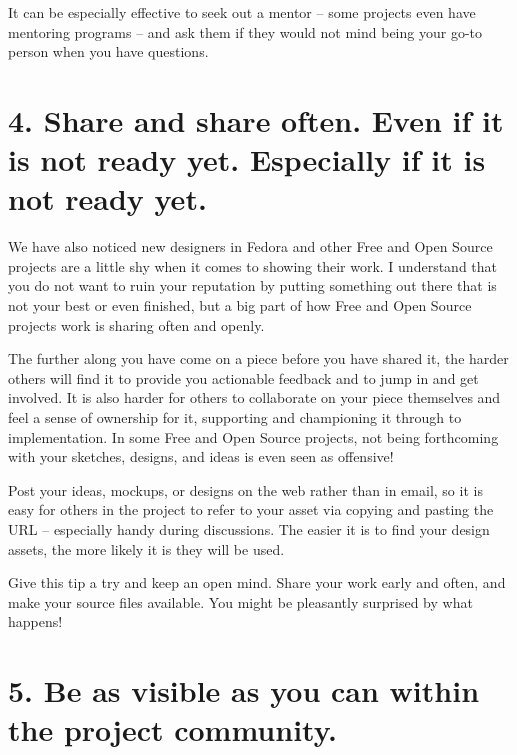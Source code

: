 It can be especially effective to seek out a mentor -- some projects even have
mentoring programs -- and ask them if they would not mind being your go-to person when you have questions. 

\section*{4. Share and share often. Even if it is not ready yet. Especially if it
is not ready yet.}

We have also noticed new designers in Fedora and other Free and Open Source projects
are a little shy when it comes to showing their work. I understand that you
do not want to ruin your reputation by putting something out there that is not
your best or even finished, but a big part of how Free and Open Source projects
work is sharing often and openly. 

The further along you have come on a piece before you have shared it, the harder
others will find it to provide you actionable feedback and to jump in and get
involved. It is also harder for others to collaborate on your piece themselves
and feel a sense of ownership for it, supporting and championing it through to
implementation. In some Free and Open Source projects, not being forthcoming with
your sketches, designs, and ideas is even seen as offensive! 

Post your ideas, mockups, or designs on the web rather than in email, so it is
easy for others in the project to refer to your asset via copying and pasting the
URL -- especially handy during discussions. The easier it is to find your design
assets, the more likely it is they will be used. 

Give this tip a try and keep an open mind. Share your work early and often, and
make your source files available. You might be pleasantly surprised by what
happens!

\section*{5. Be as visible as you can within the project community.}

